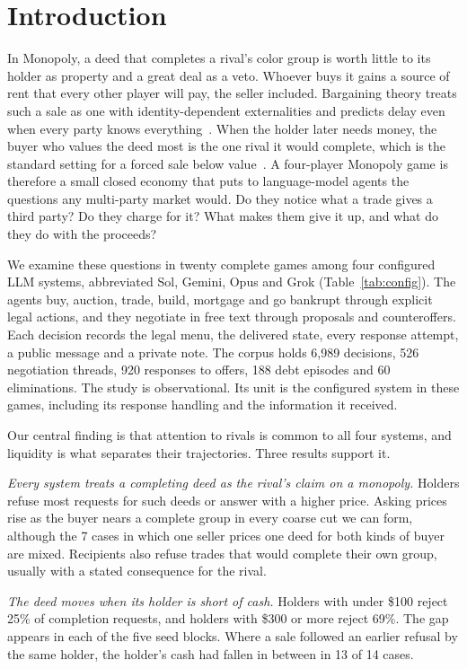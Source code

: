 \section{Introduction}

In Monopoly, a deed that completes a rival's color group is worth little to its holder as property and a great deal as a veto. Whoever buys it gains a source of rent that every other player will pay, the seller included. Bargaining theory treats such a sale as one with identity-dependent externalities and predicts delay even when every party knows everything~\cite{jehiel1995delay}. When the holder later needs money, the buyer who values the deed most is the one rival it would complete, which is the standard setting for a forced sale below value~\cite{shleifer1992liquidation}. A four-player Monopoly game is therefore a small closed economy that puts to language-model agents the questions any multi-party market would. Do they notice what a trade gives a third party? Do they charge for it? What makes them give it up, and what do they do with the proceeds?

We examine these questions in twenty complete games among four configured LLM systems, abbreviated Sol, Gemini, Opus and Grok (Table~\ref{tab:config}). The agents buy, auction, trade, build, mortgage and go bankrupt through explicit legal actions, and they negotiate in free text through proposals and counteroffers. Each decision records the legal menu, the delivered state, every response attempt, a public message and a private note. The corpus holds 6,989 decisions, 526 negotiation threads, 920 responses to offers, 188 debt episodes and 60 eliminations. The study is observational. Its unit is the configured system in these games, including its response handling and the information it received.

Our central finding is that attention to rivals is common to all four systems, and liquidity is what separates their trajectories. Three results support it.

\emph{Every system treats a completing deed as the rival's claim on a monopoly.} Holders refuse most requests for such deeds or answer with a higher price. Asking prices rise as the buyer nears a complete group in every coarse cut we can form, although the 7 cases in which one seller prices one deed for both kinds of buyer are mixed. Recipients also refuse trades that would complete their own group, usually with a stated consequence for the rival.

\emph{The deed moves when its holder is short of cash.} Holders with under \$100 reject 25\% of completion requests, and holders with \$300 or more reject 69\%. The gap appears in each of the five seed blocks. Where a sale followed an earlier refusal by the same holder, the holder's cash had fallen in between in 13 of 14 cases.

